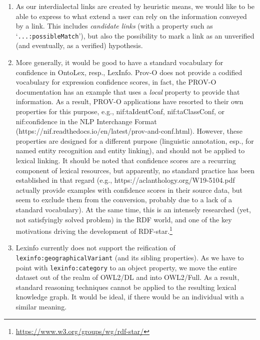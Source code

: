 \documentclass[11pt]{article}
\newcommand{\onto}[1]{\texttt{#1}} %
\begin{document}
\begin{enumerate}
\item As our interdialectal links are created by heuristic means, we would like to be able to express to what extend a user can rely on the information conveyed by a link. This includes \emph{candidate links} (with a property such as `\onto{...:possibleMatch}'), but also the possibility to mark a link as an unverified (and eventually, as a verified) hypothesis.
\item More generally, it would be good to have a standard vocabulary for confidence in OntoLex, resp., LexInfo. Prov-O does not provide a codified vocabulary for expression confidence scores, in fact, the PROV-O documentation has an example that uses a \emph{local} property to provide that information. As a result, PROV-O applications have resorted to their own properties for this purpose, e.g., nif:taIdentConf, nif:taClassConf, or nif:confidence in the NLP Interchange Format (https://nif.readthedocs.io/en/latest/prov-and-conf.html). However, these properties are designed for a different purpose (linguistic annotation, esp., for named entity recognition and entity linking), and should not be applied to lexical linking. It should be noted that confidence scores are a recurring component of lexical resources, but apparently, no standard practice has been established in that regard (e.g., https://aclanthology.org/W19-5104.pdf actually provide examples with confidence scores in their source data, but seem to exclude them from the conversion, probably due to a lack of a standard vocabulary). At the same time, this is an intensely researched (yet, not satisfyingly solved problem) in the RDF world, and one of the key motivations driving the development of RDF-star.\footnote{\url{https://www.w3.org/groups/wg/rdf-star/}}
\item Lexinfo currently does not support the reification of \onto{lexinfo:geographicalVariant} (and its sibling properties). As we have to point with \onto{lexinfo:category} to an object property, we move the entire dataset out of the realm of OWL2/DL and into OWL2/Full. As a result, standard reasoning techniques cannot be applied to the resulting lexical knowledge graph. It would be ideal, if there would be an individual with a similar meaning.
\end{enumerate}
\end{document}
